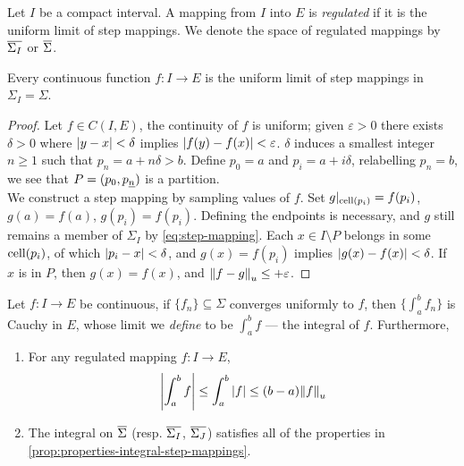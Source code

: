 \documentclass[../main-manifolds.tex]{subfiles}
\begin{document}
\begin{definition}\label{def:regulated-mappings}
    Let $I$ be a compact interval. A mapping from $I$ into $E$ is \emph{regulated} if it is the uniform limit of step mappings. We denote the space of regulated mappings by $\overline{\Sigma_I}$ or $\overline{\Sigma}$.
\end{definition}
\begin{wts}\label{prop:continuity-implies-regulated-mapping}
    Every continuous function $f: I\to E$ is the uniform limit of step mappings in $\Sigma_I = \Sigma$.
\end{wts}
\begin{proof}
    Let $f\in C(I, E)$, the continuity of $f$ is uniform; given $\varepsilon>0$ there exists $\delta>0$ where $\abs{y-x}<\delta$ implies $\abs{f(y)-f(x)}<\varepsilon$. $\delta$ induces a smallest integer $n\geq 1$ such that $p_{n}=a + n\delta > b$. Define $p_0 = a$ and $p_i = a + i\delta$, relabelling $p_{n} = b$, we see that $P = (p_0,\UL{p}[n])$ is a partition.\\

    We construct a step mapping by sampling values of $f$. Set $g\vert_{\operatorname{cell}(p_i)}=f(p_{i})$, $g(a) = f(a)$, $g(p_i) = f(p_i)$. Defining the endpoints is necessary, and $g$ still remains a member of $\Sigma_I$ by \cref{eq:step-mapping}. Each $x\in I\setminus P$ belongs in some $\operatorname{cell}(p_i)$, of which $\abs{p_i - x}<\delta$, and $g(x)=f(p_i)$ implies $\abs{g(x)-f(x)}<\delta$. If $x$ is in $P$, then $g(x) = f(x)$, and $\norm{f-g}_{u}\leq+\varepsilon$.
\end{proof}
\begin{wts}\label{prop:continuous-extension-integral-to-regulated-mappings}
    Let $f: I \to E$ be continuous, if $\{f_n\}\subseteq \Sigma$ converges uniformly to $f$, then $\{\int_a^b f_n\}$ is Cauchy in $E$, whose limit we \emph{define} to be $\int_a^b f$ --- the integral of $f$. Furthermore, 
    \begin{enumerate}
        \item For any regulated mapping $f: I\to E$,
        \begin{equation}\label{eq:regulated-mapping-integral-continuous}
            \abs{\int_a^b f}\leq \int_a^b\abs{f} \leq (b-a)\norm{f}_u
        \end{equation}
        \item The integral on $\overline{\Sigma}$  (resp. $\overline{\Sigma_I}$, $\overline{\Sigma_J}$) satisfies all of the properties in \cref{prop:properties-integral-step-mappings}.
    \end{enumerate}
\end{wts}
\end{document}
